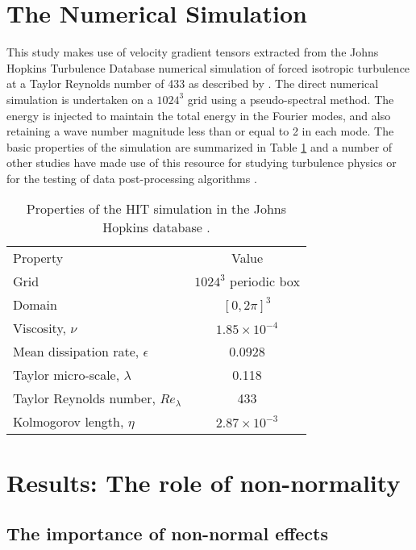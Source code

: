 \documentclass[preprint,amssymb,amsmath,aip,cha]{revtex4-1}
\begin{document}
\section{The Numerical Simulation}
This study makes use of velocity gradient tensors extracted from the Johns Hopkins Turbulence Database numerical simulation of forced isotropic turbulence at a Taylor Reynolds number of 433 \citep{yili} as described by \citet{jhu17}. The direct numerical simulation is undertaken on a $1024^{3}$ grid using a pseudo-spectral method. The energy is injected to maintain the total energy in the Fourier modes, and also retaining a wave number magnitude less than or equal to 2 in each mode. The basic properties of the simulation are summarized in Table \ref{tab.HIT} and a number of other studies have made use of this resource for studying turbulence physics \citep{wan2010,lawsondawson15} or for the testing of data post-processing algorithms \citep{higham16}. 
\begin{table}
\caption{Properties of the HIT simulation in the Johns Hopkins database \citep{yili}.}
\label{tab.HIT}
\begin{center}
\begin{tabular}{lc}
 Property & Value\\
Grid & $1024^{3}$ periodic box\\
Domain & $[0, 2\pi]^{3}$\\
Viscosity, $\nu$ & $1.85 \times 10^{-4}$\\
Mean dissipation rate, $\epsilon$ & 0.0928\\
Taylor micro-scale, $\lambda$ & 0.118\\
Taylor Reynolds number, $Re_{\lambda}$ & 433\\
Kolmogorov length, $\eta$ & $2.87 \times 10^{-3}$\\
\end{tabular}
\end{center} 
\end{table}

\section{Results: The role of non-normality}

\subsection{The importance of non-normal effects}
\label{sect.ResKappa}
\end{document}
